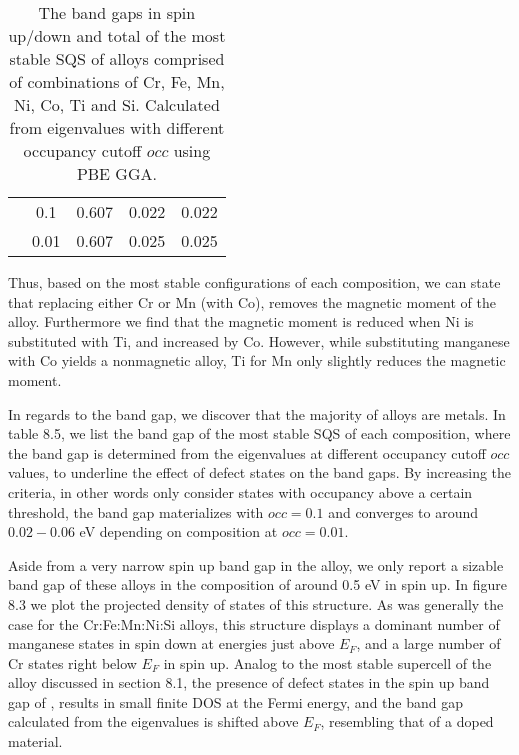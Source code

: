 \begin{table}[H]
\begin{tabular}{@{}ccccc@{}}
\multicolumn{1}{c|}{}                             & \multicolumn{1}{c|}{0.1}  & 0.607                                                                         & 0.022                                                                        & 0.022                                                                         \\
\multicolumn{1}{c|}{}                             & \multicolumn{1}{c|}{0.01}                      & 0.607                                                                         & 0.025                                                                        & 0.025                                                                         \\ \bottomrule
\end{tabular}
\caption{The band gaps in spin up/down and total of the most stable SQS of alloys comprised of combinations of Cr, Fe, Mn, Ni, Co, Ti and Si. Calculated from eigenvalues with different occupancy cutoff $occ$ using PBE GGA.}
\end{table}

Thus, based on the most stable configurations of each composition, we can state that replacing either Cr or Mn (with Co), removes the magnetic moment of the alloy. Furthermore we find that the magnetic moment is reduced when Ni is substituted with Ti, and increased by Co. However, while substituting manganese with Co yields a nonmagnetic alloy, Ti for Mn only slightly reduces the magnetic moment. 

In regards to the band gap, we discover that the majority of alloys are metals. In table 8.5, we list the band gap of the most stable SQS of each composition, where the band gap is determined from the eigenvalues at different occupancy cutoff $occ$ values, to underline the effect of defect states on the band gaps. By increasing the criteria, in other words only consider states with occupancy above a certain threshold, the band gap materializes with $occ = 0.1$ and converges to around $0.02 - 0.06$ eV depending on composition at $occ = 0.01$.
 
Aside from a very narrow spin up band gap in the  alloy, we only report a sizable band gap of these alloys in the  composition of around 0.5 eV in spin up. In figure 8.3 we plot the projected density of states of this structure. As was generally the case for the Cr:Fe:Mn:Ni:Si alloys, this structure displays a dominant number of manganese states in spin down at energies just above $E_F$, and a large number of Cr states right below $E_F$ in spin up. Analog to the most stable supercell of the  alloy discussed in section 8.1, the presence of defect states in the spin up band gap of , results in small finite DOS at the Fermi energy, and the band gap calculated from the eigenvalues is shifted above $E_F$, resembling that of a doped material.  
  
